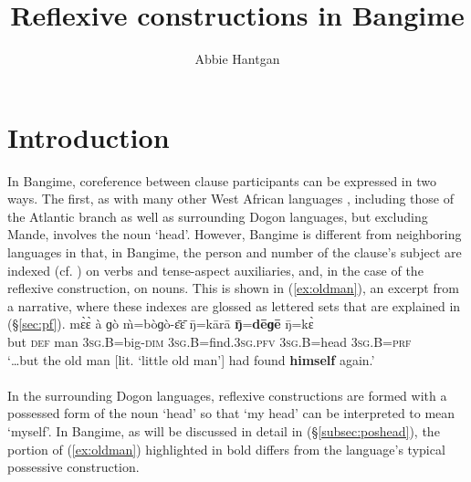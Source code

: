 \documentclass[output=paper]{langscibook}
\author{Abbie Hantgan\affiliation{CNRS-LLACAN}}
\title{Reflexive constructions in Bangime}
\begin{document}
\maketitle

\section{Introduction}
\label{sec:intro}
In Bangime, coreference between clause participants can be expressed in two ways. The first, as with many other West African languages \citep{Heine2011}, including those of the Atlantic branch as well as surrounding Dogon languages, but excluding Mande, involves the noun `head'. However, Bangime is different from neighboring languages in that, in Bangime, the person and number of the clause's subject are indexed (cf. \citealt{Haspelmath2013}) on verbs and tense-aspect auxiliaries, and, in the case of the reflexive construction, on nouns. This is shown in (\ref{ex:oldman}), an excerpt from a narrative, where these indexes are glossed as lettered sets that are explained in (\S \ref{sec:pf}).
\ea \label{ex:oldman}
\gll 
mɛ̀ɛ̀ à ɡò m̀=bòɡò-ɛ̄ɛ̄ ŋ̄=kārā \textbf{ŋ̄}=\textbf{dēɡē} ŋ̄=kɛ̀ \\
but \textsc{def} man 3\textsc{sg}.B=big-\textsc{dim} 3\textsc{sg}.B=find.3\textsc{sg}.\textsc{pfv} 3\textsc{sg}.B=head 3\textsc{sg}.B=\textsc{prf} \\
\glt `\dots but the old man [lit. `little old man'] had found \textbf{himself} again.' \\
 \citep[10]{HantganHeath2018} \\
\z
In the surrounding Dogon languages, reflexive constructions are formed with a possessed form of the noun `head' so that `my head' can be interpreted to mean `myself'. In Bangime, as will be discussed in detail in (\S \ref{subsec:poshead}), the portion of (\ref{ex:oldman}) highlighted in bold differs from the language's typical possessive construction.
\end{document}
